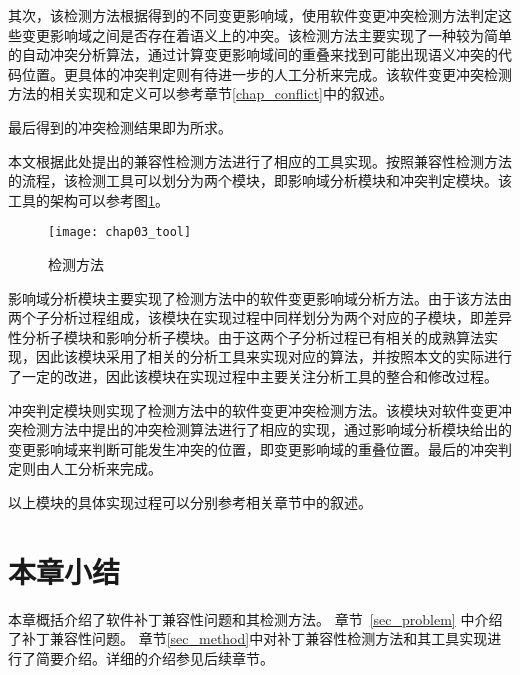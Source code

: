 其次，该检测方法根据得到的不同变更影响域，使用软件变更冲突检测方法判定这些变更影响域之间是否存在着语义上的冲突。该检测方法主要实现了一种较为简单的自动冲突分析算法，通过计算变更影响域间的重叠来找到可能出现语义冲突的代码位置。更具体的冲突判定则有待进一步的人工分析来完成。该软件变更冲突检测方法的相关实现和定义可以参考章节\ref {chap_conflict}中的叙述。

最后得到的冲突检测结果即为所求。

本文根据此处提出的兼容性检测方法进行了相应的工具实现。按照兼容性检测方法的流程，该检测工具可以划分为两个模块，即影响域分析模块和冲突判定模块。该工具的架构可以参考图\ref{chap03_tool}。

\begin{figure}[H]
	\centering
	\texttt{[image: chap03\_tool]}
	\caption {检测方法}
	\label {chap03_tool}	
\end{figure}

影响域分析模块主要实现了检测方法中的软件变更影响域分析方法。由于该方法由两个子分析过程组成，该模块在实现过程中同样划分为两个对应的子模块，即差异性分析子模块和影响分析子模块。由于这两个子分析过程已有相关的成熟算法实现，因此该模块采用了相关的分析工具来实现对应的算法，并按照本文的实际进行了一定的改进，因此该模块在实现过程中主要关注分析工具的整合和修改过程。

冲突判定模块则实现了检测方法中的软件变更冲突检测方法。该模块对软件变更冲突检测方法中提出的冲突检测算法进行了相应的实现，通过影响域分析模块给出的变更影响域来判断可能发生冲突的位置，即变更影响域的重叠位置。最后的冲突判定则由人工分析来完成。


以上模块的具体实现过程可以分别参考相关章节中的叙述。

\section{本章小结}
本章概括介绍了软件补丁兼容性问题和其检测方法。
章节~\ref{sec_problem} 中介绍了补丁兼容性问题。
章节\ref {sec_method}中对补丁兼容性检测方法和其工具实现进行了简要介绍。详细的介绍参见后续章节。


